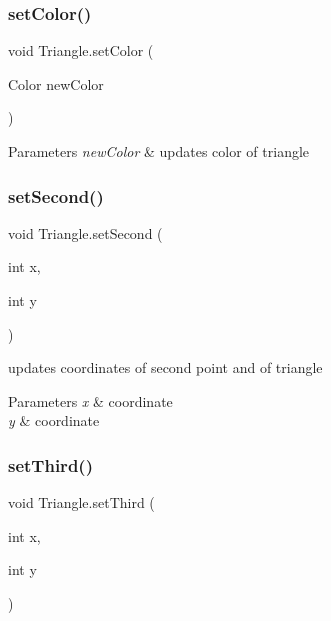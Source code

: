 \subsubsection{\texorpdfstring{set\+Color()}{setColor()}}
{\footnotesize\ttfamily void Triangle.\+set\+Color (\begin{DoxyParamCaption}\item[{Color}]{new\+Color }\end{DoxyParamCaption})\hspace{0.3cm}{\ttfamily [inline]}}


\begin{DoxyParams}{Parameters}
{\em new\+Color} & updates color of triangle \\
\hline
\end{DoxyParams}
\mbox{\label{classTriangle_af67a3dc7d192c0cb93fa2a72d01c0ba1}} 
\subsubsection{\texorpdfstring{set\+Second()}{setSecond()}}
{\footnotesize\ttfamily void Triangle.\+set\+Second (\begin{DoxyParamCaption}\item[{int}]{x,  }\item[{int}]{y }\end{DoxyParamCaption})\hspace{0.3cm}{\ttfamily [inline]}}

updates coordinates of second point and of triangle 
\begin{DoxyParams}{Parameters}
{\em x} & coordinate \\
\hline
{\em y} & coordinate \\
\hline
\end{DoxyParams}
\mbox{\label{classTriangle_a829c600b572f4f4e0d205f97d69dd764}} 
\subsubsection{\texorpdfstring{set\+Third()}{setThird()}}
{\footnotesize\ttfamily void Triangle.\+set\+Third (\begin{DoxyParamCaption}\item[{int}]{x,  }\item[{int}]{y }\end{DoxyParamCaption})\hspace{0.3cm}{\ttfamily [inline]}}

